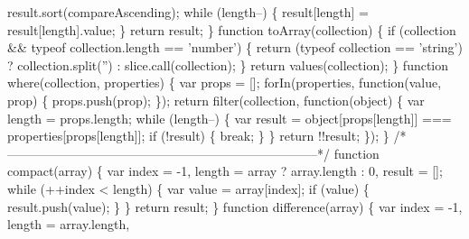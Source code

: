 \begin{DoxyCodeInclude}
{{\textcolor{stringliteral}{    result.sort(compareAscending);}
\textcolor{stringliteral}{    while (length--) \{}
\textcolor{stringliteral}{      result[length] = result[length].value;}
\textcolor{stringliteral}{    \}}
\textcolor{stringliteral}{    return result;}
\textcolor{stringliteral}{  \}}
\textcolor{stringliteral}{}
\textcolor{stringliteral}{  function toArray(collection) \{}
\textcolor{stringliteral}{    if (collection && typeof collection.length == 'number') \{}
\textcolor{stringliteral}{      return (typeof collection == 'string')}
\textcolor{stringliteral}{        ? collection.split('')}
\textcolor{stringliteral}{        : slice.call(collection);}
\textcolor{stringliteral}{    \}}
\textcolor{stringliteral}{    return values(collection);}
\textcolor{stringliteral}{  \}}
\textcolor{stringliteral}{}
\textcolor{stringliteral}{  function where(collection, properties) \{}
\textcolor{stringliteral}{    var props = [];}
\textcolor{stringliteral}{    forIn(properties, function(value, prop) \{}
\textcolor{stringliteral}{      props.push(prop);}
\textcolor{stringliteral}{    \});}
\textcolor{stringliteral}{    return filter(collection, function(object) \{}
\textcolor{stringliteral}{      var length = props.length;}
\textcolor{stringliteral}{      while (length--) \{}
\textcolor{stringliteral}{        var result = object[props[length]] === properties[props[length]];}
\textcolor{stringliteral}{        if (!result) \{}
\textcolor{stringliteral}{          break;}
\textcolor{stringliteral}{        \}}
\textcolor{stringliteral}{      \}}
\textcolor{stringliteral}{      return !!result;}
\textcolor{stringliteral}{    \});}
\textcolor{stringliteral}{  \}}
\textcolor{stringliteral}{}
\textcolor{stringliteral}{  /*--------------------------------------------------------------------------*/}
\textcolor{stringliteral}{}
\textcolor{stringliteral}{  function compact(array) \{}
\textcolor{stringliteral}{    var index = -1,}
\textcolor{stringliteral}{        length = array ? array.length : 0,}
\textcolor{stringliteral}{        result = [];}
\textcolor{stringliteral}{}
\textcolor{stringliteral}{    while (++index < length) \{}
\textcolor{stringliteral}{      var value = array[index];}
\textcolor{stringliteral}{      if (value) \{}
\textcolor{stringliteral}{        result.push(value);}
\textcolor{stringliteral}{      \}}
\textcolor{stringliteral}{    \}}
\textcolor{stringliteral}{    return result;}
\textcolor{stringliteral}{  \}}
\textcolor{stringliteral}{}
\textcolor{stringliteral}{  function difference(array) \{}
\textcolor{stringliteral}{    var index = -1,}
\textcolor{stringliteral}{        length = array.length,}
}}
\end{DoxyCodeInclude}
